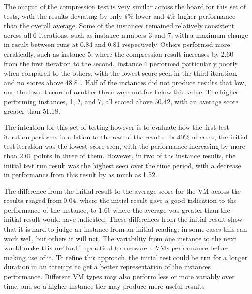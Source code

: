 \documentclass{llncs}
\begin{document}
\begin{table*}[!h]
\begin{adjustbox}{width=\linewidth,center}
\end{adjustbox}
\end{table*}

The output of the compression test is very similar across the board for this set of tests, with the results deviating by only 6\% lower and 4\% higher performance than the overall average. Some of the instances remained relatively consistent across all 6 iterations, such as instance numbers 3 and 7, with a maximum change in result between runs at 0.84 and 0.81 respectively. Others performed more erratically, such as instance 5, where the compression result increases by 2.60 from the first iteration to the second. Instance 4 performed particularly poorly when compared to the others, with the lowest score seen in the third iteration, and no scores above 48.81. Half of the instances did not produce results that low, and the lowest score of another three were not far below this value. The higher performing instances, 1, 2, and 7, all scored above 50.42, with an average score greater than 51.18.

The intention for this set of testing however is to evaluate how the first test iteration performs in relation to the rest of the results. In 40\% of cases, the initial test iteration was the lowest score seen, with the performance increasing by more than 2.00 points in three of them. However, in two of the instance results, the initial test run result was the highest seen over the time period, with a decrease in performance from this result by as much as 1.52.

The difference from the initial result to the average score for the VM across the results ranged from 0.04, where the initial result gave a good indication to the performance of the instance, to 1.60 where the average was greater than the initial result would have indicated. These differences from the initial result show that it is hard to judge an instance from an initial reading; in some cases this can work well, but others it will not. The variability from one instance to the next would make this method impractical to measure a VMs performance before making use of it. To refine this approach, the initial test could be run for a longer duration in an attempt to get a better representation of the instances performance. Different VM types may also perform less or more variably over time, and so a higher instance tier may produce more useful results.
\end{document}
